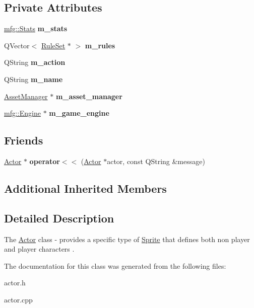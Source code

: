 \subsection*{Private Attributes}
\begin{DoxyCompactItemize}
\item 
\mbox{\label{class_actor_a6ceacbad9e2f687e035f1dbb6025b41e}} 
\hyperlink{structmfg_1_1_stats}{mfg\+::\+Stats} {\bfseries m\+\_\+stats}
\item 
\mbox{\label{class_actor_a6e4a97f36f8f4b8516fdb315b0f68543}} 
Q\+Vector$<$ \hyperlink{class_rule_set}{Rule\+Set} $\ast$ $>$ {\bfseries m\+\_\+rules}
\item 
\mbox{\label{class_actor_ae3c7bb3e0a6548749b14b6d38b5b50ac}} 
Q\+String {\bfseries m\+\_\+action}
\item 
\mbox{\label{class_actor_a487d4e428e72810694df2bc7885f3cff}} 
Q\+String {\bfseries m\+\_\+name}
\item 
\mbox{\label{class_actor_a68280d58a3ca52e36b826dcce8d4599b}} 
\hyperlink{class_asset_manager}{Asset\+Manager} $\ast$ {\bfseries m\+\_\+asset\+\_\+manager}
\item 
\mbox{\label{class_actor_aab6640a44131bbabd6f02bc396afdbf0}} 
\hyperlink{classmfg_1_1_engine}{mfg\+::\+Engine} $\ast$ {\bfseries m\+\_\+game\+\_\+engine}
\end{DoxyCompactItemize}
\subsection*{Friends}
\begin{DoxyCompactItemize}
\item 
\mbox{\label{class_actor_af3ffe8761cd2ebd2b92033654d49a2e7}} 
\hyperlink{class_actor}{Actor} $\ast$ {\bfseries operator$<$$<$} (\hyperlink{class_actor}{Actor} $\ast$actor, const Q\+String \&message)
\end{DoxyCompactItemize}
\subsection*{Additional Inherited Members}


\subsection{Detailed Description}
The \hyperlink{class_actor}{Actor} class -\/ provides a specific type of \hyperlink{class_sprite}{Sprite} that defines both non player and player characters . 

The documentation for this class was generated from the following files\+:\begin{DoxyCompactItemize}
\item 
actor.\+h\item 
actor.\+cpp\end{DoxyCompactItemize}
